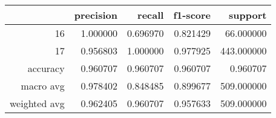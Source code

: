 \begin{tabular}{rrrrr}
\toprule
 & precision & recall & f1-score & support \\
\midrule
16 & 1.000000 & 0.696970 & 0.821429 & 66.000000 \\
17 & 0.956803 & 1.000000 & 0.977925 & 443.000000 \\
accuracy & 0.960707 & 0.960707 & 0.960707 & 0.960707 \\
macro avg & 0.978402 & 0.848485 & 0.899677 & 509.000000 \\
weighted avg & 0.962405 & 0.960707 & 0.957633 & 509.000000 \\
\bottomrule
\end{tabular}

